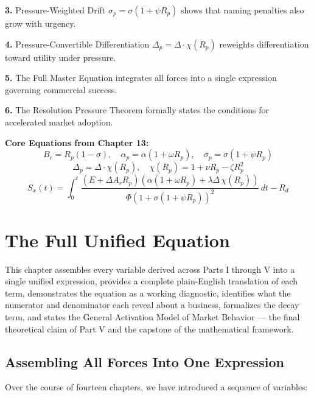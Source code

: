 \documentclass[12pt, openany]{book}
\theoremstyle{thmstyle}
\theoremstyle{defstyle}
\begin{document}
\textbf{3.} Pressure-Weighted Drift $\sigma_p = \sigma(1+\psi R_p)$ shows that naming penalties also grow with urgency.

\textbf{4.} Pressure-Convertible Differentiation $\Delta_p = \Delta \cdot \chi(R_p)$ reweights differentiation toward utility under pressure.

\textbf{5.} The Full Master Equation integrates all forces into a single expression governing commercial success.

\textbf{6.} The Resolution Pressure Theorem formally states the conditions for accelerated market adoption.

\begin{equationbox}
\textbf{Core Equations from Chapter 13:}
\[
B_c = R_p(1 - \sigma), \quad \alpha_p = \alpha(1 + \omega R_p), \quad \sigma_p = \sigma(1 + \psi R_p)
\]
\[
\Delta_p = \Delta \cdot \chi(R_p), \quad \chi(R_p) = 1 + \nu R_p - \zeta R_p^2
\]
\[
S_x(t) = \int_0^t
\frac{(E + \Delta A_r R_p)(\alpha(1+\omega R_p)+\lambda\Delta\,\chi(R_p))}
{\Phi(1+\sigma(1+\psi R_p))^2}\,dt - R_d
\]
\end{equationbox}

\chapter{The Full Unified Equation}

\begin{keybox}
This chapter assembles every variable derived across Parts I through V into a single unified expression, provides a complete plain-English translation of each term, demonstrates the equation as a working diagnostic, identifies what the numerator and denominator each reveal about a business, formalizes the decay term, and states the General Activation Model of Market Behavior --- the final theoretical claim of Part V and the capstone of the mathematical framework.
\end{keybox}

\section{Assembling All Forces Into One Expression}

Over the course of fourteen chapters, we have introduced a sequence of variables:
\end{document}
